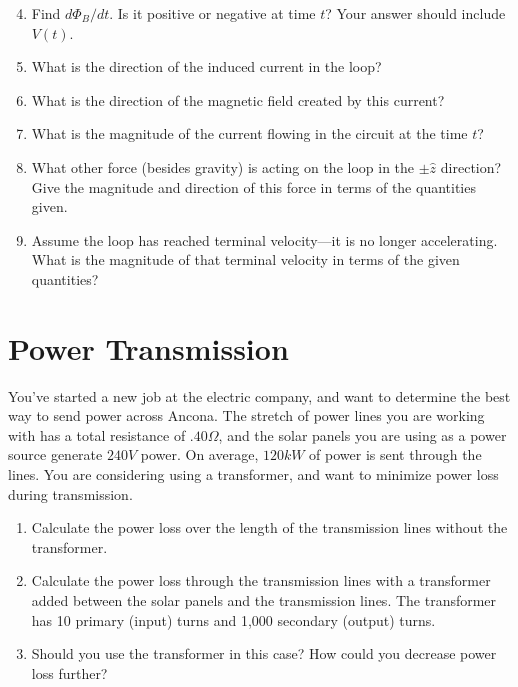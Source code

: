 \documentclass[a4paper]{article}
\begin{document}
\begin{enumerate}[label=(\alph*), itemsep=9.8mm,topsep=9.8mm]
    \setcounter{enumi}{3}
    \item Find $d\Phi_B/dt$. Is it positive or negative at time $t$? Your answer should include $V(t)$.
    \item What is the direction of the induced current in the loop?
    \item What is the direction of the magnetic field created by this current? 
    \item What is the magnitude of the current flowing in the circuit at the time $t$?
    \item What other force (besides gravity) is acting on the loop in the $\pm \hat{z}$ direction? Give the magnitude and direction of this force in terms of the quantities given.
    \item Assume the loop has reached terminal velocity---it is no longer accelerating. What is the magnitude of that terminal velocity in terms of the given quantities?
 \end{enumerate}
 
\section{Power Transmission}
You've started a new job at the electric company, and want to determine the best way to send power across Ancona. The stretch of power lines you are working with has a total resistance of $.40 \Omega$, and the solar panels you are using as a power source generate $240V$ power. On average, $120 kW$ of power is sent through the lines. You are considering using a transformer, and want to minimize power loss during transmission. 

\begin{enumerate}[label=(\alph*), itemsep=9.8mm,after=\vspace{9.8mm}]
\item Calculate the power loss over the length of the transmission lines without the transformer.

\item Calculate the power loss through the transmission lines with a transformer added between the solar panels and the transmission lines. The transformer has 10 primary (input) turns and 1,000 secondary (output) turns.

\item Should you use the transformer in this case? How could you decrease power loss further?

\end{enumerate}
\end{document}
